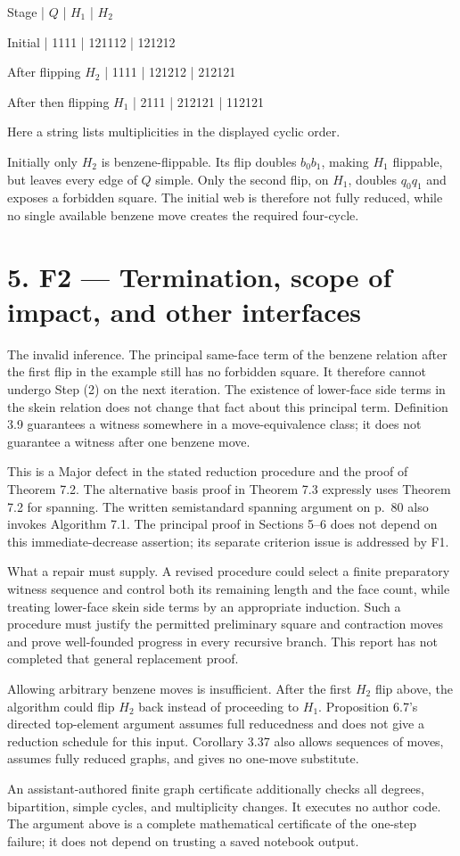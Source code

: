 \documentclass[10pt]{article}
\begin{document}
Stage | \(Q\) | \(H_1\) | \(H_2\)\par
Initial | 1111 | 121112 | 121212\par
After flipping \(H_2\) | 1111 | 121212 | 212121\par
After then flipping \(H_1\) | 2111 | 212121 | 112121\par
Here a string lists multiplicities in the displayed cyclic order.\par
Initially only \(H_2\) is benzene-flippable. Its flip doubles \(b_0b_1\), making \(H_1\) flippable, but leaves every edge of \(Q\) simple. Only the second flip, on \(H_1\), doubles \(q_0q_1\) and exposes a forbidden square. The initial web is therefore not fully reduced, while no single available benzene move creates the required four-cycle.\par
\section*{5. F2 — Termination, scope of impact, and other interfaces}
The invalid inference. The principal same-face term of the benzene relation after the first flip in the example still has no forbidden square. It therefore cannot undergo Step (2) on the next iteration. The existence of lower-face side terms in the skein relation does not change that fact about this principal term. Definition 3.9 guarantees a witness somewhere in a move-equivalence class; it does not guarantee a witness after one benzene move.\par
This is a Major defect in the stated reduction procedure and the proof of Theorem 7.2. The alternative basis proof in Theorem 7.3 expressly uses Theorem 7.2 for spanning. The written semistandard spanning argument on p. 80 also invokes Algorithm 7.1. The principal proof in Sections 5–6 does not depend on this immediate-decrease assertion; its separate criterion issue is addressed by F1.\par
What a repair must supply. A revised procedure could select a finite preparatory witness sequence and control both its remaining length and the face count, while treating lower-face skein side terms by an appropriate induction. Such a procedure must justify the permitted preliminary square and contraction moves and prove well-founded progress in every recursive branch. This report has not completed that general replacement proof.\par
Allowing arbitrary benzene moves is insufficient. After the first \(H_2\) flip above, the algorithm could flip \(H_2\) back instead of proceeding to \(H_1\). Proposition 6.7’s directed top-element argument assumes full reducedness and does not give a reduction schedule for this input. Corollary 3.37 also allows sequences of moves, assumes fully reduced graphs, and gives no one-move substitute.\par
An assistant-authored finite graph certificate additionally checks all degrees, bipartition, simple cycles, and multiplicity changes. It executes no author code. The argument above is a complete mathematical certificate of the one-step failure; it does not depend on trusting a saved notebook output.\par
\end{document}
